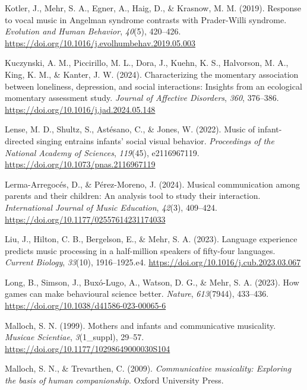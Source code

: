\documentclass[
]{article}
\newlength{\cslhangindent}
\newenvironment{CSLReferences}[2] %
 {\begin{list}{}{%
  \setlength{\itemindent}{0pt}
  \setlength{\leftmargin}{0pt}
  \setlength{\parsep}{0pt}
  \ifodd #1
   \setlength{\leftmargin}{\cslhangindent}
   \setlength{\itemindent}{-1\cslhangindent}
  \fi
  \setlength{\itemsep}{#2\baselineskip}}}
 {\end{list}}
\begin{document}
\begin{CSLReferences}{1}{0}
Kotler, J., Mehr, S. A., Egner, A., Haig, D., \& Krasnow, M. M. (2019).
Response to vocal music in {Angelman} syndrome contrasts with
{Prader-Willi} syndrome. \emph{Evolution and Human Behavior},
\emph{40}(5), 420--426.
\url{https://doi.org/10.1016/j.evolhumbehav.2019.05.003}

Kuczynski, A. M., Piccirillo, M. L., Dora, J., Kuehn, K. S., Halvorson,
M. A., King, K. M., \& Kanter, J. W. (2024). Characterizing the
momentary association between loneliness, depression, and social
interactions: {Insights} from an ecological momentary assessment study.
\emph{Journal of Affective Disorders}, \emph{360}, 376--386.
\url{https://doi.org/10.1016/j.jad.2024.05.148}

Lense, M. D., Shultz, S., Astésano, C., \& Jones, W. (2022). Music of
infant-directed singing entrains infants' social visual behavior.
\emph{Proceedings of the National Academy of Sciences}, \emph{119}(45),
e2116967119. \url{https://doi.org/10.1073/pnas.2116967119}

Lerma-Arregocés, D., \& Pérez-Moreno, J. (2024). Musical communication
among parents and their children: {An} analysis tool to study their
interaction. \emph{International Journal of Music Education},
\emph{42}(3), 409--424. \url{https://doi.org/10.1177/02557614231174033}

Liu, J., Hilton, C. B., Bergelson, E., \& Mehr, S. A. (2023). Language
experience predicts music processing in a half-million speakers of
fifty-four languages. \emph{Current Biology}, \emph{33}(10),
1916--1925.e4. \url{https://doi.org/10.1016/j.cub.2023.03.067}

Long, B., Simson, J., Buxó-Lugo, A., Watson, D. G., \& Mehr, S. A.
(2023). How games can make behavioural science better. \emph{Nature},
\emph{613}(7944), 433--436.
\url{https://doi.org/10.1038/d41586-023-00065-6}

Malloch, S. N. (1999). Mothers and infants and communicative musicality.
\emph{Musicae Scientiae}, \emph{3}(1\_suppl), 29--57.
\url{https://doi.org/10.1177/10298649000030S104}

Malloch, S. N., \& Trevarthen, C. (2009). \emph{Communicative
musicality: {Exploring} the basis of human companionship}. Oxford
University Press.


\end{CSLReferences}
\end{document}
